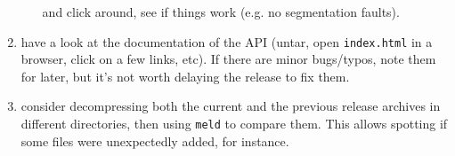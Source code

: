 \begin{enumerate}
\begin{itemize}
    and click around, see if things work (e.g. no segmentation faults).
  \end{itemize}
\item have a look at the documentation of the API (untar, open
  \texttt{index.html} in a browser, click on a few links, etc).
  If there are minor bugs/typos, note them for later, but it's not
  worth delaying the release to fix them.
\item consider decompressing both the current and the previous release archives
  in different directories, then using \texttt{meld} to compare them. This
  allows spotting if some files were unexpectedly added, for instance.
\end{enumerate}


